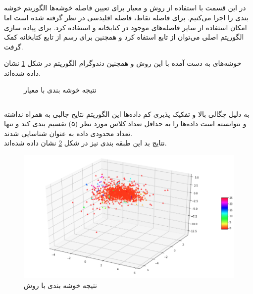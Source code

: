\subsection{}
در این قسمت با استفاده از روش  و معیار  برای تعیین فاصله خوشه‌ها الگوریتم خوشه بندی  را اجرا می‌کنیم. برای فاصله نقاط، فاصله اقلیدسی در نظر گرفته شده است اما امکان استفاده از سایر فاصله‌های موجود در کتابخانه   و  استفاده کرد. برای پیاده سازی الگوریتم اصلی می‌توان از تابع  استفاه کرد و همچنین برای رسم  از تابع  کتابخانه  کمک گرفت.

خوشه‌های به دست آمده با این روش و همچنین دندوگرام الگوریتم در شکل \ref{fig:ward} نشان داده شده‌اند.
\begin{figure}[h]
    \centering
    \caption{نتیجه خوشه بندی با معیار }
    \label{fig:ward}
\end{figure}

\subsection{}
به دلیل چگالی بالا و تفکیک پذیری کم داده‌ها این الگوریتم نتایج جالبی  به همراه نداشته و نتوانسته است داده‌ها را به حداقل تعداد کلاس مورد نظر (۵) تقسیم بندی کند و تنها تعداد محدودی داده به عنوان  شناسایی شدند.
\\
نتایج بد این طبقه بندی نیز در شکل \ref{fig:dbscan} نشان داده شده‌اند.

\begin{figure}[h!]
    \centering
    \includegraphics[width=0.65\linewidth]{images/dbscan1.png}
    \caption{نتیجه خوشه بندی با روش }
    \label{fig:dbscan}
\end{figure}


